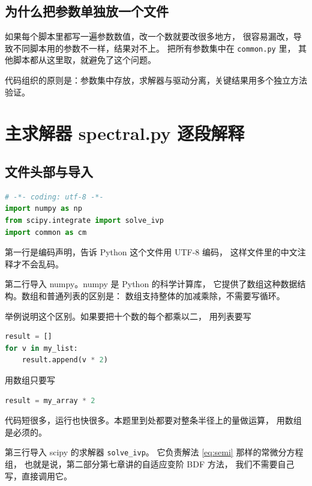 \subsection{为什么把参数单独放一个文件}

如果每个脚本里都写一遍参数数值，改一个数就要改很多地方，
很容易漏改，导致不同脚本用的参数不一样，结果对不上。
把所有参数集中在 \texttt{common.py} 里，
其他脚本都从这里取，就避免了这个问题。

\keypoint
代码组织的原则是：参数集中存放，求解器与驱动分离，关键结果用多个独立方法验证。

\section{主求解器 spectral.py 逐段解释}

\subsection{文件头部与导入}

\begin{lstlisting}[language=Python]
# -*- coding: utf-8 -*-
import numpy as np
from scipy.integrate import solve_ivp
import common as cm
\end{lstlisting}

第一行是编码声明，告诉 Python 这个文件用 UTF-8 编码，
这样文件里的中文注释才不会乱码。

第二行导入 numpy。numpy 是 Python 的科学计算库，
它提供了数组这种数据结构。数组和普通列表的区别是：
数组支持整体的加减乘除，不需要写循环。

举例说明这个区别。如果要把十个数的每个都乘以二，
用列表要写

\begin{lstlisting}[language=Python]
result = []
for v in my_list:
    result.append(v * 2)
\end{lstlisting}

用数组只要写

\begin{lstlisting}[language=Python]
result = my_array * 2
\end{lstlisting}

代码短很多，运行也快很多。本题里到处都要对整条半径上的量做运算，
用数组是必须的。

第三行导入 scipy 的求解器 \texttt{solve\_ivp}。
它负责解法 \eqref{eq:semi} 那样的常微分方程组，
也就是说，第二部分第七章讲的自适应变阶 BDF 方法，
我们不需要自己写，直接调用它。

